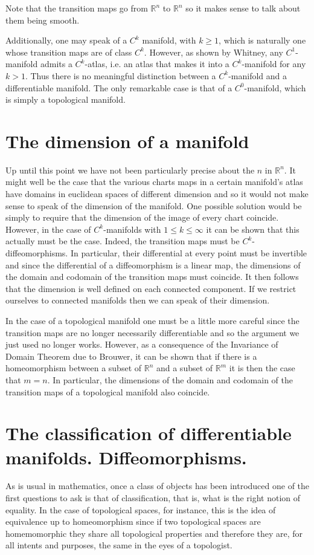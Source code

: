 \documentclass[12pt,oneside]{book}
\numberwithin{table}{section}
\numberwithin{equation}{section}
\numberwithin{figure}{section}
\newcommand{\R}{\mathbb{R}}
\begin{document}
Note that the transition maps go from \( \R^n \) to \( \R^n \) so it makes sense to talk about them being smooth. 

Additionally, one may speak of a \( C^k \) manifold, with \( k \geq 1 \), which is naturally one whose transition maps are of class \( C^k \). However, as shown by Whitney, any \( C^1 \)-manifold admits a \( C^k \)-atlas, i.e. an atlas that makes it into a \( C^k \)-manifold for any \( k > 1 \). Thus there is no meaningful distinction between a \( C^k \)-manifold and a differentiable manifold. The only remarkable case is that of a \( C^0 \)-manifold, which is simply a topological manifold. 

\section{The dimension of a manifold}
Up until this point we have not been particularly precise about the \( n \) in \( \R^n \). It might well be the case that the various charts maps in a certain manifold's atlas have domains in euclidean spaces of different dimension and so it would not make sense to speak of the dimension of the manifold. One possible solution would be simply to require that the dimension of the image of every chart coincide. However, in the case of \( C^k \)-manifolds with \( 1 \leq k \leq \infty \) it can be shown that this actually must be the case. Indeed, the transition maps must be \( C^k \)-diffeomorphisms. In particular, their differential at every point must be invertible and since the differential of a diffeomorphism is a linear map, the dimensions of the domain and codomain of the transition maps must coincide. It then follows that the dimension is well defined on each connected component. If we restrict ourselves to connected manifolds then we can speak of their dimension. 

In the case of a topological manifold one must be a little more careful since the transition maps are no longer necessarily differentiable and so the argument we just used no longer works. However, as a consequence of the Invariance of Domain Theorem due to Brouwer, it can be shown that if there is a homeomorphism between a subset of \( \R^n \) and a subset of \( \R^m \) it is then the case that \( m = n \). In particular, the dimensions of the domain and codomain of the transition maps of a topological manifold also coincide. 

\section{The classification of differentiable manifolds. Diffeomorphisms.}
As is usual in mathematics, once a class of objects has been introduced one of the first questions to ask is that of classification, that is, what is the right notion of equality. In the case of topological spaces, for instance, this is the idea of equivalence up to homeomorphism since if two topological spaces are homemomorphic they share all topological properties and therefore they are, for all intents and purposes, the same in the eyes of a topologist. 
\end{document}

